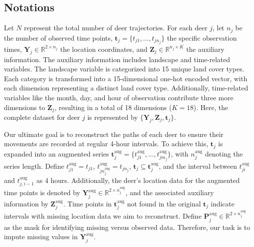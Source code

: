 \documentclass[11pt]{article}
\begin{document}
\subsection{Notations}
Let $N$ represent the total number of deer trajectories. For each deer $j$, let $n_j$ be the number of observed time points, $\bm{t}_j = \{t_{j1}, \ldots, t_{jn_j}\}$ the specific observation times, $\bm{Y}_j \in \mathbb{R}^{2 \times n_j}$ the location coordinates, and $\bm{Z}_j \in \mathbb{R}^{n_j \times K}$ the auxiliary information. The auxiliary information includes landscape and time-related variables. The landscape variable is categorized into 15 unique land cover types. Each category is transformed into a 15-dimensional one-hot encoded vector, with each dimension representing a distinct land cover type. Additionally, time-related variables like the month, day, and hour of observation contribute three more dimensions to $\bm{Z}_j$, resulting in a total of 18 dimensions ($K=18$). Here, the complete dataset for deer $j$ is represented by $\{\bm{Y}_j, \bm{Z}_j, \bm{t}_j\}$.


Our ultimate goal is to reconstruct the paths of each deer to ensure their movements are recorded at regular 4-hour intervals. To achieve this, $\bm{t}_j$ is expanded into an augmented series $\bm{t}_j^{\mathrm{aug}}=\{t_{j1}^{\mathrm{aug}},\ldots,t_{jm_j}^{\mathrm{aug}}\}$, with $n_j^{\mathrm{aug}}$ denoting the series length. Define $t_{j1}^{\mathrm{aug}}=t_{j1}$, $t_{jn_j^{\mathrm{aug}}}^{\mathrm{aug}}=t_{jn_j}$, $\bm{t}_j\subseteq \bm{t}_j^{\mathrm{aug}}$, and the interval between $t_{ji}^{\mathrm{aug}}$ and $t_{j,i-1}^{\mathrm{aug}}$ as 4 hours. Additionally, the deer's location data for the augmented time points is denoted by $\bm{Y}_j^{\mathrm{aug}}\in \mathbb{R}^{2\times n_j^{\mathrm{aug}}}$, and the associated auxiliary information by $\bm{Z}_j^{\mathrm{aug}}$. Time points in $\bm{t}_j^{\mathrm{aug}}$ not found in the original $\bm{t}_j$ indicate intervals with missing location data we aim to reconstruct. Define $\bm{P}_j^{\mathrm{aug}}\in \mathbb{R}^{2\times n_j^{\mathrm{aug}}}$ as the mask for identifying missing versus observed data. Therefore, our task is to impute missing values in $\bm{Y}_j^{\mathrm{aug}}$.
\end{document}
